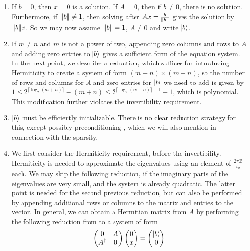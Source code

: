 \begin{enumerate}[label=\arabic*.]
    \item If \(b = 0\), then \(x = 0\) is a solution. If \(A = 0\), then if \(b \neq 0\), there is no solution. Furthermore, if \(\norm{b} \neq 1\), then solving after \(Ax = \frac{b}{\norm{b}}\) gives the solution by \(\norm{b}x\). So we may now assume \(\norm{b} = 1\), \(A \neq 0\) and write \(\ket{b}\).
    \item If \(m \neq n\) and \(m\) is not a power of two, appending zero columns and rows to \(A\) and adding zero entries to \(\ket{b}\) gives a sufficient form of the equation system. In the next point, we describe a reduction, which suffices for introducing Hermiticity to create a system of form \((m+n) \times (m+n)\), so the number of rows and columns for \(A\) and zero entries for \(\ket{b}\) we need to add is given by \(1 \leq 2^{\lceil\log_2(m+n)\rceil}-(m+n) \leq 2^{\lceil \log_2(m+n)\rceil-1}-1\), which is polynomial. This modification further violates the invertibility requirement.
    \item \(\ket{b}\) must be efficiently initializable. There is no clear reduction strategy for this, except possibly preconditioning \cite[p. 4]{Harrow2008}, which we will also mention in connection with the sparsity.
    \item We first consider the Hermiticity requirement, before the invertibility. Hermiticity is needed to approximate the eigenvalues using an element of \(\frac{2 \pi \mathbb{Z}}{t_0}\) each. We may skip the following reduction, if the imaginary parts of the eigenvalues are very small, and the system is already quadratic. The latter point is needed for the second previous reduction, but can also be performed by appending additional rows or columns to the matrix and entries to the vector. In general, we can obtain a Hermitian matrix from \(A\) by performing the following reduction from \cite[p. 11-12]{Harrow2008} to a system of form
    \begin{align}
        \begin{pmatrix}
            0 & A\\
            A^\dagger & 0
        \end{pmatrix} \begin{pmatrix}
            0\\
            x
        \end{pmatrix} = \begin{pmatrix}
            \ket{b}\\
            0
        \end{pmatrix}

\end{align}
\end{enumerate}
